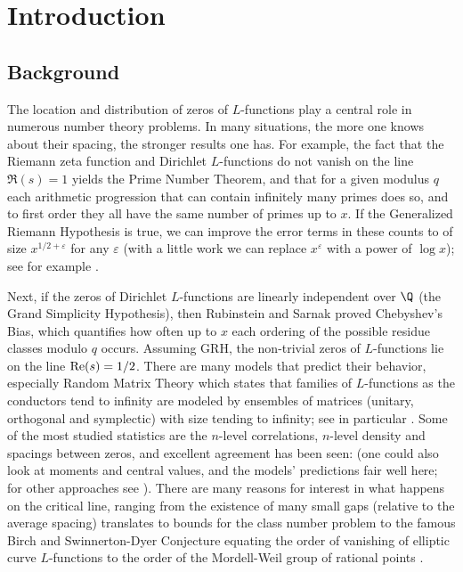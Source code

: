 \documentclass[12pt, reqno]{amsart}
\numberwithin{equation}{section}
\theoremstyle{definition}
\theoremstyle{remark}
\renewcommand{\epsilon}{\varepsilon}
\begin{document}
\section{Introduction}

\subsection{Background}

The location and distribution of zeros of $L$-functions play a central role in numerous number theory problems. In many situations, the more one knows about their spacing, the stronger results one has. For example, the fact that the Riemann zeta function and Dirichlet $L$-functions do not vanish on the line ${\Re}(s) = 1$ yields the Prime Number Theorem, and that for a given modulus $q$ each arithmetic progression that can contain infinitely many primes does so, and to first order they all have the same number of primes up to $x$. If the Generalized Riemann Hypothesis is true, we can improve the error terms in these counts to of size $x^{1/2 + \epsilon}$ for any $\epsilon$ (with a little work we can replace $x^\epsilon$ with a power of $\log x$); see for example  \cite{Da,IK}.

Next, if the zeros of Dirichlet $L$-functions are linearly independent over $\Q$ (the Grand Simplicity Hypothesis), then Rubinstein and Sarnak \cite{RubSa} proved Chebyshev's Bias, which quantifies how often up to $x$ each ordering of the possible residue classes modulo $q$ occurs. Assuming GRH, the non-trivial zeros of $L$-functions lie on the line ${\rm Re}(s) = 1/2$. There are many models that predict their behavior, especially Random Matrix Theory which states that families of $L$-functions as the conductors tend to infinity are modeled by ensembles of matrices (unitary, orthogonal and symplectic) with size tending to infinity; see in particular \cite{BFMT-B, bogo, BogoKeat, Con, CFKRS, DHKMS1, DHKMS2, FM, Ha, KatzSarnak, KatzSarnak2, KeSn1, KeSn2, KeSn3}. Some of the most studied statistics are the $n$-level correlations, $n$-level density and spacings between zeros, and excellent agreement has been seen: \cite{AAILMZ, AM, CS, DM1, DM2, FiM, FI, Gallagher, Gao, GK, GJMMPP, Gu, Hej, HM, HR1, HR2, ILS, LM, Mil1, Mil2, Mil3, Mil4, MilMo, MilPe, Mon, Od1, Od1, OS1, OS2, RR, Ro, Rub, RudnickSarnak, ShTe, Ya, Yo1, Yo2} (one could also look at moments and central values, and the models' predictions fair well here; for other approaches see \cite{CFZ1, CFZ2, GHK}). There are many reasons for interest in what happens on the critical line, ranging from the existence of many small gaps (relative to the average spacing) translates to bounds for the class number problem \cite{CI} to the famous Birch and Swinnerton-Dyer Conjecture equating the order of vanishing of elliptic curve $L$-functions to the order of the Mordell-Weil group of rational points \cite{BSD1, BSD2, Gol}.
\end{document}
